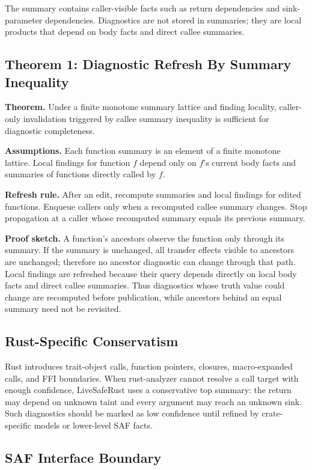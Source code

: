 \documentclass[sigconf,nonacm]{acmart}
\begin{document}
The summary contains caller-visible facts such as return dependencies and
sink-parameter dependencies. Diagnostics are not stored in summaries; they are
local products that depend on body facts and direct callee summaries.

\subsection{Theorem 1: Diagnostic Refresh By Summary Inequality}

\textbf{Theorem.} Under a finite monotone summary lattice and finding locality,
caller-only invalidation triggered by callee summary inequality is sufficient
for diagnostic completeness.

\textbf{Assumptions.} Each function summary is an element of a finite monotone
lattice. Local findings for function $f$ depend only on $f$'s current body facts
and summaries of functions directly called by $f$.

\textbf{Refresh rule.} After an edit, recompute summaries and local findings for
edited functions. Enqueue callers only when a recomputed callee summary changes.
Stop propagation at a caller whose recomputed summary equals its previous
summary.

\textbf{Proof sketch.} A function's ancestors observe the function only through
its summary. If the summary is unchanged, all transfer effects visible to
ancestors are unchanged; therefore no ancestor diagnostic can change through
that path. Local findings are refreshed because their query depends directly on
local body facts and direct callee summaries. Thus diagnostics whose truth value
could change are recomputed before publication, while ancestors behind an equal
summary need not be revisited.

\subsection{Rust-Specific Conservatism}

Rust introduces trait-object calls, function pointers, closures, macro-expanded
calls, and FFI boundaries. When rust-analyzer cannot resolve a call target with
enough confidence, LiveSafeRust uses a conservative top summary: the return may
depend on unknown taint and every argument may reach an unknown sink. Such
diagnostics should be marked as low confidence until refined by crate-specific
models or lower-level SAF facts.

\subsection{SAF Interface Boundary}
\end{document}
